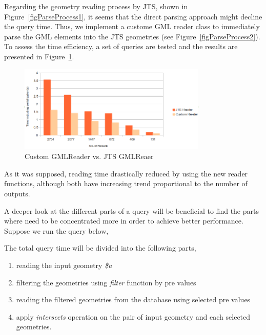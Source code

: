 \documentclass[a4paper,12pt]{article}
\begin{document}
Regarding the geometry reading process by JTS, shown in Figure~\ref{figParseProcess1}, it seems that the direct parsing approach might decline the query time. Thus, we implement a custome GML reader class to immediately parse the GML elements into the JTS geometries (see Figure~\ref{figParseProcess2}). To assess the time efficiency, a set of queries are tested and the results are presented in Figure~\ref{figGmlReader}. 

\begin{figure}
\centering
\includegraphics[width=0.8\textwidth]{GmlReader}
\caption{Custom GMLReader vs. JTS GMLReaer}
\label{figGmlReader}
\end{figure}

As it was supposed, reading time drastically reduced by using the new reader functions, although both have increasing trend proportional to the number of outputs.%

A deeper look at the different parts of a query will be beneficial to find the parts where need to be concentrated more in order to achieve better performance. Suppose we run the query below,
\vspace{10px}
\vspace{10px}
The total query time will be divided into the following parts,

\begin{enumerate}
\item reading the input geometry \textit{\$a}
\item filtering the geometries using \textit{filter} function by pre values 
\item reading the filtered geometries from the database using selected pre values
\item apply \textit{intersects} operation on the pair of input geometry and each selected geometries.
\end{enumerate}
\end{document}
